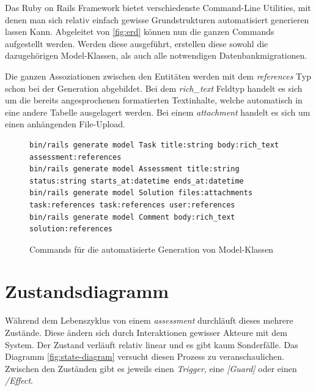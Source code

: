 Das Ruby on Rails Framework bietet verschiedenste Command-Line Utilities, mit denen man sich relativ einfach gewisse
Grundstrukturen automatisiert generieren lassen Kann. Abgeleitet von \ref{fig:erd} können nun die ganzen Commands aufgestellt werden.
Werden diese ausgeführt, erstellen diese sowohl die dazugehörigen Model-Klassen, als auch alle notwendigen Datenbankmigrationen.

Die ganzen Assoziationen zwischen den Entitäten werden mit dem \emph{references} Typ schon bei der Generation abgebildet.
Bei dem \emph{rich\_text} Feldtyp handelt es sich um die bereits angesprochenen formatierten Textinhalte,
welche automatisch in eine andere Tabelle ausgelagert werden. Bei einem \emph{attachment} handelt es sich um einen anhängenden File-Upload.

\begin{figure}[H]
\begin{codebox}[]
\begin{verbatim}
bin/rails generate model Task title:string body:rich_text assessment:references
bin/rails generate model Assessment title:string status:string starts_at:datetime ends_at:datetime
bin/rails generate model Solution files:attachments task:references task:references user:references
bin/rails generate model Comment body:rich_text solution:references 
\end{verbatim}
\end{codebox}
\caption{\label{fig:generate-models}Commands für die automatisierte Generation von Model-Klassen}
\end{figure}

\newpage

\section{Zustandsdiagramm}

Während dem Lebenszyklus von einem \emph{assessment} durchläuft dieses mehrere Zustände. Diese ändern
sich durch Interaktionen gewisser Akteure mit dem System. Der Zustand verläuft relativ linear und es gibt kaum Sonderfälle.
Das Diagramm \ref{fig:state-diagram} versucht diesen Prozess zu veranschaulichen. Zwischen den Zuständen gibt es jeweils einen 
\emph{Trigger}, eine \emph{[Guard]} oder einen \emph{/Effect}.

